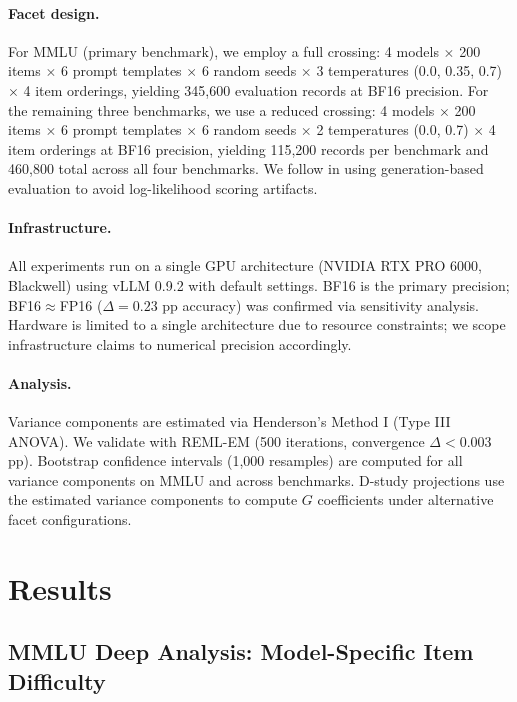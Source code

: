 \documentclass[11pt]{article}
\begin{document}
\paragraph{Facet design.}
For MMLU (primary benchmark), we employ a full crossing: 4 models $\times$ 200 items $\times$ 6 prompt templates $\times$ 6 random seeds $\times$ 3 temperatures (0.0, 0.35, 0.7) $\times$ 4 item orderings, yielding 345{,}600 evaluation records at BF16 precision.
For the remaining three benchmarks, we use a reduced crossing: 4 models $\times$ 200 items $\times$ 6 prompt templates $\times$ 6 random seeds $\times$ 2 temperatures (0.0, 0.7) $\times$ 4 item orderings at BF16 precision, yielding 115{,}200 records per benchmark and 460{,}800 total across all four benchmarks.
We follow \citet{hua2025} in using generation-based evaluation to avoid log-likelihood scoring artifacts.

\paragraph{Infrastructure.}
All experiments run on a single GPU architecture (NVIDIA RTX PRO 6000, Blackwell) using vLLM 0.9.2 with default settings.
BF16 is the primary precision; BF16$\approx$FP16 ($\Delta = 0.23$ pp accuracy) was confirmed via sensitivity analysis.
Hardware is limited to a single architecture due to resource constraints; we scope infrastructure claims to numerical precision accordingly.

\paragraph{Analysis.}
Variance components are estimated via Henderson's Method I (Type III ANOVA).
We validate with REML-EM (500 iterations, convergence $\Delta < 0.003$ pp).
Bootstrap confidence intervals (1{,}000 resamples) are computed for all variance components on MMLU and across benchmarks.
D-study projections use the estimated variance components to compute $G$ coefficients under alternative facet configurations.

\section{Results}

\subsection{MMLU Deep Analysis: Model-Specific Item Difficulty}
\label{sec:mmlu}
\end{document}
